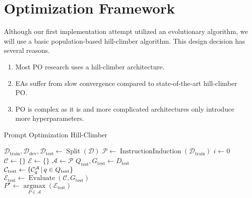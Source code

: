\section{Optimization Framework}
Although our first implementation attempt utilized an evolutionary algorithm, we will use a basic population-based hill-climber algorithm.
This design decision has several reasons.
\begin{enumerate}
    \item Most PO research uses a hill-climber architecture.
    \item EAs suffer from slow convergence compared to state-of-the-art hill-climber PO\cite{xiang2025selfsupervisedpromptoptimization}.
    \item PO is complex as it is and more complicated architectures only introduce more hyperparameters.
\end{enumerate}


\begin{algorithm}
    \caption{Prompt Optimization Hill-Climber}
    \label{alg:promptoptimloop}
    $\mathcal{D}_{\text{train}}, \mathcal{D}_{\text{dev}}, \mathcal{D}_{\text{test}} \gets \operatorname{Split}(\mathcal{D})$ 
    $\mathcal{P} \gets \operatorname{InstructionInduction}(\mathcal{D}_{\text{train}})$ 
    $i \gets 0$ 
    $\mathcal{C} \gets \{\}$  
    $\mathcal{E} \gets \{\}$ 
    $\mathcal{A} \gets \mathcal{P}$ 
    $Q_{\text{test}}, G_{\text{test}} \gets D_{\text{test}}$\\
    $\mathcal{C}_{\text{test}} \gets \{\mathcal{C}_{q}^{\mathcal{A}}\, \vert \, q \in Q_{\text{test}}\}$\\
    $\mathcal{E}_{\text{test}} \gets \operatorname{Evaluate}(\mathcal{C}, G_{\text{test}})$\\
    $P^{\star} \gets \underset{P\in\mathcal{A}}{\operatorname{argmax}}(\mathcal{E}_{\text{test}})$\\
\end{algorithm}

